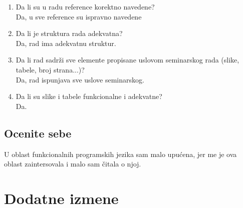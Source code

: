 \documentclass[a4paper]{report}
\begin{document}
\begin{enumerate}
\item Da li su u radu reference korektno navedene?\\
Da, u sve reference su ispravno navedene

\item Da li je struktura rada adekvatna?\\
Da, rad ima adekvatnu struktur.

\item Da li rad sadrži sve elemente propisane uslovom seminarskog rada (slike, tabele, broj strana...)?\\
Da, rad ispunjava sve uslove seminarskog.

\item Da li su slike i tabele funkcionalne i adekvatne?\\
Da.
\end{enumerate}

\section{Ocenite sebe}

U oblast funkcionalnih programskih jezika sam malo upućena, jer me je ova oblast zaintersovala i malo sam čitala o njoj.


\chapter{Dodatne izmene}
\end{document}
